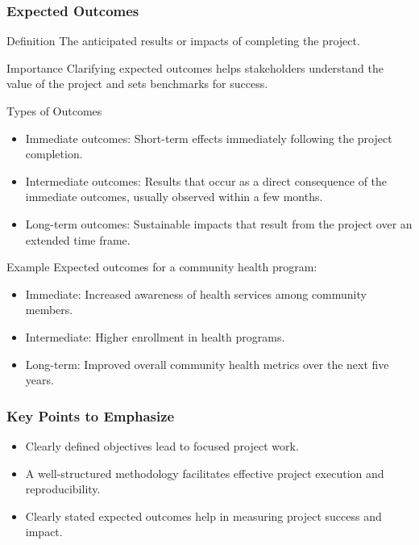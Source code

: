\documentclass[aspectratio=169]{beamer}
\begin{document}
\begin{frame}[fragile]
    \frametitle{Expected Outcomes}
    \begin{block}{Definition}
        The anticipated results or impacts of completing the project.
    \end{block}
    \begin{block}{Importance}
        Clarifying expected outcomes helps stakeholders understand the value of the project and sets benchmarks for success.
    \end{block}
    \begin{block}{Types of Outcomes}
        \begin{itemize}
            \item Immediate outcomes: Short-term effects immediately following the project completion.
            \item Intermediate outcomes: Results that occur as a direct consequence of the immediate outcomes, usually observed within a few months.
            \item Long-term outcomes: Sustainable impacts that result from the project over an extended time frame.
        \end{itemize}
    \end{block}
    \begin{block}{Example}
        Expected outcomes for a community health program:
        \begin{itemize}
            \item Immediate: Increased awareness of health services among community members.
            \item Intermediate: Higher enrollment in health programs.
            \item Long-term: Improved overall community health metrics over the next five years.
        \end{itemize}
    \end{block}
\end{frame}

\begin{frame}[fragile]
    \frametitle{Key Points to Emphasize}
    \begin{itemize}
        \item Clearly defined objectives lead to focused project work.
        \item A well-structured methodology facilitates effective project execution and reproducibility.
        \item Clearly stated expected outcomes help in measuring project success and impact.
    \end{itemize}
\end{frame}
\end{document}
